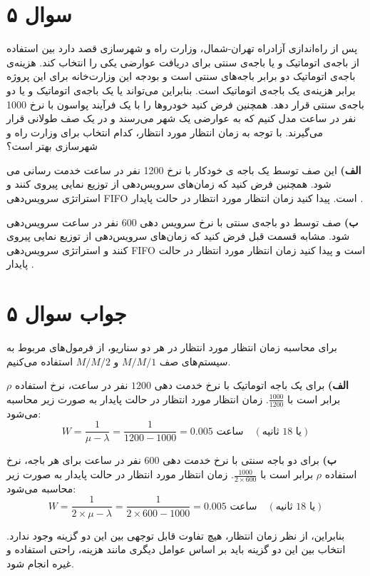 \section*{سوال ۵}

پس از راه‌اندازی آزادراه تهران-شمال، وزارت راه و شهرسازی قصد دارد بین استفاده از باجه‌ی اتوماتیک و یا باجه‌ی سنتی برای دریافت عوارضی یکی را انتخاب کند. هزینه‌ی باجه‌ی اتوماتیک دو برابر باجه‌های سنتی است و بودجه این وزارت‌خانه برای این پروژه برابر هزینه‌ی یک باجه‌ی اتوماتیک است. بنابراین می‌تواند یا یک باجه‌ی اتوماتیک و یا دو باجه‌ی سنتی قرار دهد. همچنین فرض کنید خودروها را با یک فرآیند پواسون با نرخ 1000 نفر در ساعت مدل کنیم که به عوارضی یک شهر می‌رسند و در یک صف طولانی قرار می‌گیرند. با توجه به زمان انتظار مورد انتظار، کدام انتخاب برای وزارت راه و شهرسازی بهتر است؟

\textbf{الف)}
این صف توسط یک باجه ی خودکار با نرخ 1200 نفر در ساعت خدمت رسانی می شود. همچنین فرض کنید که زمان‌های سرویس‌دهی از توزیع نمایی پیروی کنند و استراتژی سرویس‌دهی FIFO است. پیدا کنید زمان انتظار مورد انتظار در حالت پایدار 
.

\textbf{ب)}
صف توسط دو باجه‌ی سنتی با نرخ سرویس دهی 600 نفر در ساعت سرویس‌دهی شود. مشابه قسمت قبل فرض کنید که زمان‌های سرویس‌دهی از توزیع نمایی پیروی کنند و استراتژی سرویس‌دهی FIFO است و پیدا کنید زمان انتظار مورد انتظار در حالت پایدار 
.

\section*{جواب سوال ۵}

برای محاسبه زمان انتظار مورد انتظار در هر دو سناریو، از فرمول‌های مربوط به سیستم‌های صف 
$M/M/1$
 و
$M/M/2$
  استفاده می‌کنیم.

\textbf{الف)}
برای یک باجه اتوماتیک با نرخ خدمت دهی \(1200\) نفر در ساعت، نرخ استفاده \(\rho\) برابر است با \(\frac{1000}{1200}\). زمان انتظار مورد انتظار در حالت پایدار به صورت زیر محاسبه می‌شود:
\[
W = \frac{1}{\mu - \lambda} = \frac{1}{1200 - 1000} = 0.005 \text{ ساعت} \quad (\text{یا 18 ثانیه})
\]

\textbf{ب)}
برای دو باجه سنتی با نرخ خدمت دهی \(600\) نفر در ساعت برای هر باجه، نرخ استفاده \(\rho\) برابر است با \(\frac{1000}{2 \times 600}\). زمان انتظار مورد انتظار در حالت پایدار به صورت زیر محاسبه می‌شود:
\[
W = \frac{1}{2 \times \mu - \lambda} = \frac{1}{2 \times 600 - 1000} = 0.005 \text{ ساعت} \quad (\text{یا 18 ثانیه})
\]

بنابراین، از نظر زمان انتظار، هیچ تفاوت قابل توجهی بین این دو گزینه وجود ندارد. انتخاب بین این دو گزینه باید بر اساس عوامل دیگری مانند هزینه، راحتی استفاده و غیره انجام شود.